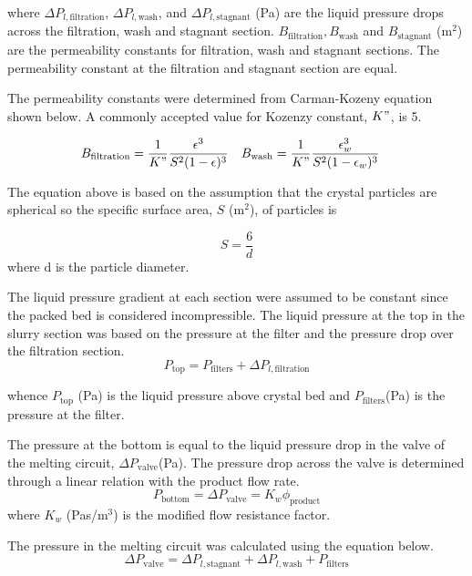 \noindent where $\Delta P_{l,\mathrm{filtration}}$, $\Delta P_{l,\mathrm{wash}}$, and $\Delta P_{l,\mathrm{stagnant}}$ (Pa) are the liquid pressure drops across the filtration, wash and stagnant section. $B_{\mathrm{filtration}},B_{\mathrm{wash}}$ and $B_{\mathrm{stagnant}}$ (m$^2$) are the permeability constants for filtration, wash and stagnant sections. The permeability constant at the filtration and stagnant section are equal. 

The permeability constants were determined  from Carman-Kozeny equation shown below. A commonly accepted value for Kozenzy constant, $K"$, is 5.

\begin{align}
   B_{\mathrm{filtration}} &= \frac{1}{K"}\frac{\epsilon^3}{S^2(1-\epsilon)^3} &
   B_{\mathrm{wash}} &= \frac{1}{K"}\frac{\epsilon_w^3}{S^2(1-\epsilon_w)^3}
\end{align}

The equation above is based on the assumption that the crystal particles are spherical so the specific surface area, $S$ (m$^2$), of particles is 

\begin{equation}
S = \frac{6}{d}
\end{equation}
\noindent where d is the particle diameter. 

The liquid pressure gradient at each section were assumed to be constant since the packed bed is considered incompressible. The liquid pressure at the top in the slurry section was based on the pressure at the filter and the pressure drop over the filtration section. 
\begin{equation}
P_{\mathrm{top}} = P_{\mathrm{filters}} + \Delta P_{l,\mathrm{filtration}}
\end{equation}

\noindent whence $P_{\mathrm{top}}$ (Pa) is the liquid pressure above crystal bed and $P_{\mathrm{filters}} $(Pa) is the pressure at the filter.

The pressure at the bottom is equal to the liquid pressure drop in the valve of the melting circuit, $\Delta P_{\mathrm{valve}} $(Pa). The pressure drop across the valve is determined through a linear relation with the product flow rate.
\begin{equation}
P_{\mathrm{bottom}}=\Delta P_{\mathrm{valve}} = K_w\phi_{\mathrm{product}}
\end{equation}
\noindent where $K_w$ (Pas/m$^3$) is the modified flow resistance factor.  

The pressure in the melting circuit was calculated using the equation below. 
\begin{equation}
\Delta P_{\mathrm{valve}} = \Delta P_{l,\mathrm{stagnant}} + \Delta P_{l,\mathrm{wash}} + P_{\mathrm{filters}}
\end{equation}

